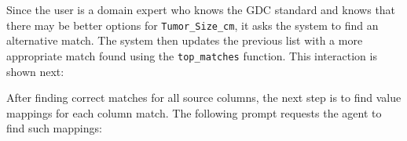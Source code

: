 Since the user is a domain expert who knows the GDC standard and knows that there may be better options for \texttt{Tumor\_Size\_cm}, it asks the system to find an alternative match. The system then updates the previous list with a more appropriate match found using the \texttt{top\_matches} function. This interaction is shown next:

\vbox{
} %


After finding correct matches for all source columns, the next step is to find value mappings for each column match. The following prompt requests the agent to find such mappings:

